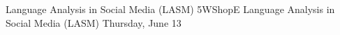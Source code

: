 \begin{wsschedule}
{Language Analysis in Social Media (LASM)}
{5}{WShopE}
{Language Analysis in Social Media (LASM)}
{Thursday, June 13}{\WShopLocE}

\end{wsschedule}
